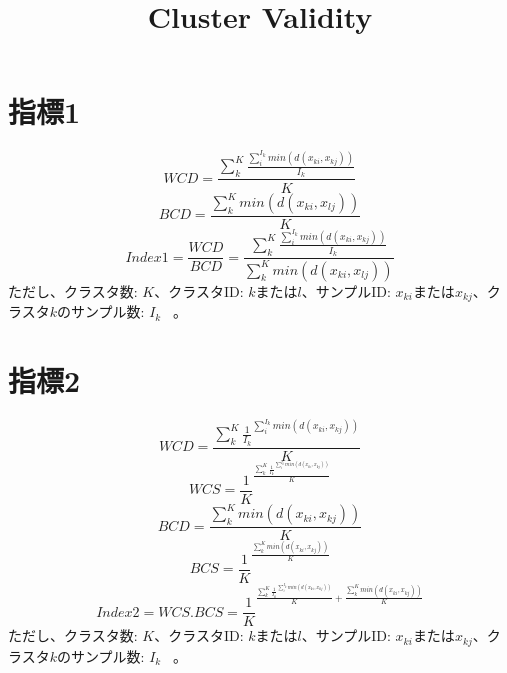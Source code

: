 \documentclass{article}
\title{Cluster Validity}
\begin{document}
\maketitle
\section{指標1}
\begin{equation}
WCD=\frac{\sum_{k}^{K}{\frac{\sum_{i}^{I_k}{min(d(x_{ki},x_{kj}))}}{I_k}}}{K}
\end{equation}
\begin{equation}
BCD=\frac{\sum_{k}^{K}{min(d(x_{ki},x_{lj}))}}{K}
\end{equation}
\begin{equation}
Index1=\frac{WCD}{BCD}=\frac{\sum_{k}^{K}{\frac{\sum_{i}^{I_k}{min(d(x_{ki},x_{kj}))}}{I_k}}}{\sum_{k}^{K}{min(d(x_{ki},x_{lj}))}}
\end{equation}
ただし、クラスタ数: $K$、クラスタID: $k$または$l$、サンプルID: $x_{ki}$または$x_{kj}$、クラスタ$k$のサンプル数: $I_k$  \ 。

\section{指標2}
\begin{equation}
WCD=\frac{\sum_{k}^{K}{{\frac{1}{I_k}}^{\sum_{i}^{I_k}{min(d(x_{ki},x_{kj}))}}}}{K}
\end{equation}
\begin{equation}
WCS={\frac{1}{K}}^{\frac{\sum_{k}^{K}{{\frac{1}{I_k}}^{\sum_{i}^{I_k}{min(d(x_{ki},x_{kj}))}}}}{K}}
\end{equation}
\begin{equation}
BCD=\frac{\sum_{k}^{K}{min(d(x_{ki},x_{kj}))}}{K}
\end{equation}
\begin{equation}
BCS={\frac{1}{K}}^{\frac{\sum_{k}^{K}{min(d(x_{ki},x_{kj}))}}{K}}
\end{equation}
\begin{equation}
Index2=WCS . BCS={\frac{1}{K}}^{\frac{\sum_{k}^{K}{{\frac{1}{I_k}}^{\sum_{i}^{I_k}{min(d(x_{ki},x_{kj}))}}}}{K} + \frac{\sum_{k}^{K}{min(d(x_{ki},x_{kj}))}}{K}}
\end{equation}
ただし、クラスタ数: $K$、クラスタID: $k$または$l$、サンプルID: $x_{ki}$または$x_{kj}$、クラスタ$k$のサンプル数: $I_k$  \ 。
\end{document}
